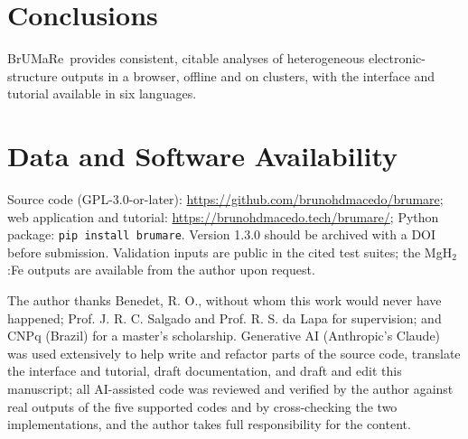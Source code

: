 \documentclass[journal=jcisd8,manuscript=note]{achemso}
\newcommand{\BMR}{\textsf{BrUMa\textcolor[HTML]{B26B00}{Re}}}
\newcommand{\code}[1]{\texttt{#1}}
\begin{document}
\section{Conclusions}
\BMR\ provides consistent, citable analyses of heterogeneous electronic-structure outputs in a browser, offline and on clusters, with the interface and tutorial available in six languages.

\section{Data and Software Availability}
Source code (GPL-3.0-or-later): \url{https://github.com/brunohdmacedo/brumare}; web application and tutorial: \url{https://brunohdmacedo.tech/brumare/}; Python package: \code{pip install brumare}. Version 1.3.0 should be archived with a DOI before submission. Validation inputs are public in the cited test suites; the MgH$_2$:Fe outputs are available from the author upon request.

\begin{acknowledgement}
The author thanks Benedet, R. O., without whom this work would never have happened; Prof. J. R. C. Salgado and Prof. R. S. da Lapa for supervision; and CNPq (Brazil) for a master's scholarship. Generative AI (Anthropic's Claude) was used extensively to help write and refactor parts of the source code, translate the interface and tutorial, draft documentation, and draft and edit this manuscript; all AI-assisted code was reviewed and verified by the author against real outputs of the five supported codes and by cross-checking the two implementations, and the author takes full responsibility for the content.
\end{acknowledgement}


\end{document}
